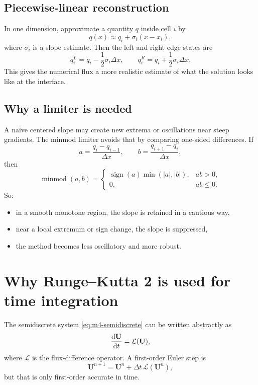 \documentclass[11pt]{article}
\newcommand{\Uvec}{\mathbf{U}}
\begin{document}
\subsection{Piecewise-linear reconstruction}
In one dimension, approximate a quantity $q$ inside cell $i$ by
\begin{equation}
q(x)\approx q_i+\sigma_i(x-x_i),
\label{eq:m4-linear}
\end{equation}
where $\sigma_i$ is a slope estimate. Then the left and right edge states are
\begin{equation}
q_i^{L}=q_i-\frac12 \sigma_i \Delta x,
\qquad
q_i^{R}=q_i+\frac12 \sigma_i \Delta x.
\label{eq:m4-lr}
\end{equation}
This gives the numerical flux a more realistic estimate of what the solution looks like at the interface.

\subsection{Why a limiter is needed}
A naive centered slope may create new extrema or oscillations near steep gradients. The minmod limiter avoids that by comparing one-sided differences. If
\begin{equation}
a=\frac{q_i-q_{i-1}}{\Delta x},
\qquad
b=\frac{q_{i+1}-q_i}{\Delta x},
\end{equation}
then
\begin{equation}
\operatorname{minmod}(a,b)
=
\begin{cases}
\operatorname{sign}(a)\min(|a|,|b|), & ab>0,\\
0, & ab\le 0.
\end{cases}
\label{eq:m4-minmod}
\end{equation}
So:
\begin{itemize}[leftmargin=1.8em]
    \item in a smooth monotone region, the slope is retained in a cautious way,
    \item near a local extremum or sign change, the slope is suppressed,
    \item the method becomes less oscillatory and more robust.
\end{itemize}

\section{Why Runge--Kutta 2 is used for time integration}
The semidiscrete system \eqref{eq:m4-semidiscrete} can be written abstractly as
\begin{equation}
\dv{\Uvec}{t}=\mathcal{L}(\Uvec),
\label{eq:m4-ode}
\end{equation}
where $\mathcal{L}$ is the flux-difference operator. A first-order Euler step is
\begin{equation}
\Uvec^{n+1}=\Uvec^n+\Delta t\,\mathcal{L}(\Uvec^n),
\end{equation}
but that is only first-order accurate in time.
\end{document}
